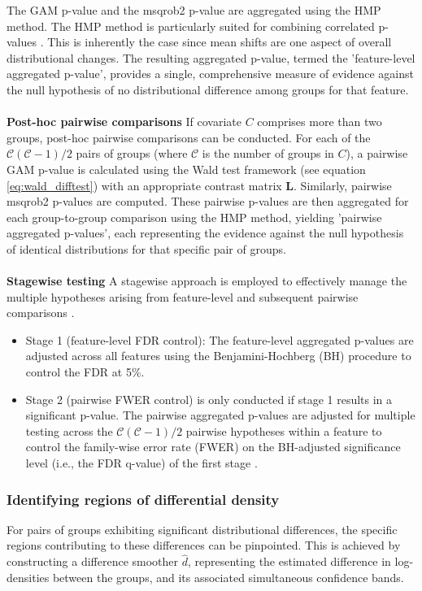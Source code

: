 The GAM p-value and the msqrob2 p-value are aggregated using the HMP method. The HMP method is particularly suited for combining correlated p-values \cite{harmonicp}. This is inherently the case since mean shifts are one aspect of overall distributional changes.
The resulting aggregated p-value, termed the 'feature-level aggregated p-value', provides a single, comprehensive measure of evidence against the null hypothesis of no distributional difference among groups for that feature.
\\
\\
\textbf{Post-hoc pairwise comparisons}
If covariate $C$ comprises more than two groups, post-hoc pairwise comparisons can be conducted. For each of the $\mathcal{C}(\mathcal{C}-1)/2$ pairs of groups (where $\mathcal{C}$ is the number of groups in $C$), a pairwise GAM p-value is calculated using the Wald test framework (see equation \ref{eq:wald_difftest}) with an appropriate contrast matrix $\boldsymbol{L}$. Similarly, pairwise msqrob2 p-values are computed. These pairwise p-values are then aggregated for each group-to-group comparison using the HMP method, yielding 'pairwise aggregated p-values', each representing the evidence against the null hypothesis of identical distributions for that specific pair of groups.
\\
\\
\textbf{Stagewise testing}
A stagewise approach is employed to effectively manage the multiple hypotheses arising from feature-level and subsequent pairwise comparisons \cite{stagewise_testing}.
\begin{itemize}
    \item Stage 1 (feature-level FDR control): The feature-level aggregated p-values are adjusted across all features using the Benjamini-Hochberg (BH) procedure to control the FDR at 5\%.

    \item Stage 2 (pairwise FWER control) is only conducted if stage 1 results in a significant p-value. The pairwise aggregated p-values are adjusted for multiple testing across the $\mathcal{C}(\mathcal{C}-1)/2$ pairwise hypotheses within a feature to control the family-wise error rate (FWER) on the BH-adjusted significance level (i.e., the FDR q-value) of the first stage \cite{stager}.
\end{itemize}


\subsubsection{Identifying regions of differential density}
For pairs of groups exhibiting significant distributional differences, the specific regions contributing to these differences can be pinpointed. This is achieved by constructing a difference smoother $\hat{d}$, representing the estimated difference in log-densities between the groups, and its associated simultaneous confidence bands.


